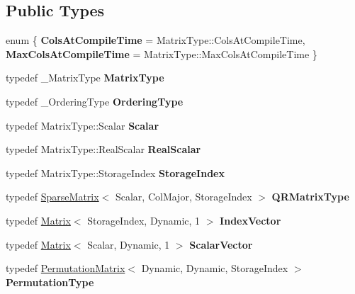 \subsection*{Public Types}
\begin{DoxyCompactItemize}
\item 
\mbox{\label{class_eigen_1_1_sparse_q_r_aafa37012150856516ba08d5ebf458256}} 
enum \{ {\bfseries Cols\+At\+Compile\+Time} = Matrix\+Type\+::Cols\+At\+Compile\+Time, 
{\bfseries Max\+Cols\+At\+Compile\+Time} = Matrix\+Type\+::Max\+Cols\+At\+Compile\+Time
 \}
\item 
\mbox{\label{class_eigen_1_1_sparse_q_r_ad358268460ec00e9cd058846a2cbb6f5}} 
typedef \+\_\+\+Matrix\+Type {\bfseries Matrix\+Type}
\item 
\mbox{\label{class_eigen_1_1_sparse_q_r_a6b2f072bb9206c83f6046f25fcc4dbbe}} 
typedef \+\_\+\+Ordering\+Type {\bfseries Ordering\+Type}
\item 
\mbox{\label{class_eigen_1_1_sparse_q_r_a1b368cb269850c36954d938a9e216ee9}} 
typedef Matrix\+Type\+::\+Scalar {\bfseries Scalar}
\item 
\mbox{\label{class_eigen_1_1_sparse_q_r_a30621d97daf0e3ef2337b7c37cb8f3d9}} 
typedef Matrix\+Type\+::\+Real\+Scalar {\bfseries Real\+Scalar}
\item 
\mbox{\label{class_eigen_1_1_sparse_q_r_a2e4bf46ef8f961837762d60860748938}} 
typedef Matrix\+Type\+::\+Storage\+Index {\bfseries Storage\+Index}
\item 
\mbox{\label{class_eigen_1_1_sparse_q_r_ac76f0c57477167d62af888c0d41d6efc}} 
typedef \mbox{\hyperlink{class_eigen_1_1_sparse_matrix}{Sparse\+Matrix}}$<$ Scalar, Col\+Major, Storage\+Index $>$ {\bfseries Q\+R\+Matrix\+Type}
\item 
\mbox{\label{class_eigen_1_1_sparse_q_r_ac9b87ec35a55751c2c439265b22d5931}} 
typedef \mbox{\hyperlink{class_eigen_1_1_matrix}{Matrix}}$<$ Storage\+Index, Dynamic, 1 $>$ {\bfseries Index\+Vector}
\item 
\mbox{\label{class_eigen_1_1_sparse_q_r_a97c9c4b7cf2b31182acf410253682f07}} 
typedef \mbox{\hyperlink{class_eigen_1_1_matrix}{Matrix}}$<$ Scalar, Dynamic, 1 $>$ {\bfseries Scalar\+Vector}
\item 
\mbox{\label{class_eigen_1_1_sparse_q_r_a7cddb16fd69b520c7881288d5d7cf7c6}} 
typedef \mbox{\hyperlink{class_eigen_1_1_permutation_matrix}{Permutation\+Matrix}}$<$ Dynamic, Dynamic, Storage\+Index $>$ {\bfseries Permutation\+Type}
\end{DoxyCompactItemize}
